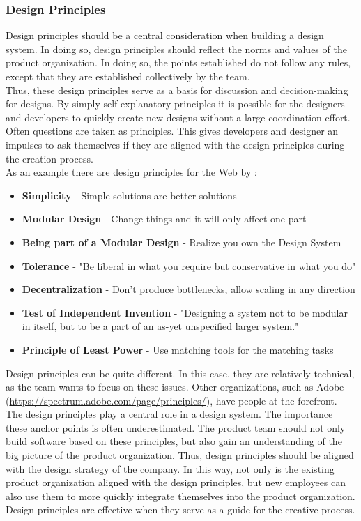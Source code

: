 \subsubsection{Design Principles}
Design principles should be a central consideration when building a design system. In doing so, design principles should reflect the norms and values of the product organization.  In doing so, the points established do not follow any rules, except that they are established collectively by the team.  \\
Thus, these design principles serve as a basis for discussion and decision-making for designs. By simply self-explanatory principles it is possible for the designers and developers to quickly create new designs without a large coordination effort. Often questions are taken as principles. This gives developers and designer an impulses to ask themselves if they are aligned with the design principles during the creation process. \cite{brignell_design_2022} \\
As an example there are design principles for the Web by \citet{berners-lee_principles_2013}: 
\begin{itemize}
\item \textbf{Simplicity} - Simple solutions are better solutions
\item \textbf{Modular Design} - Change things and it will only affect one part
\item \textbf{Being part of a Modular Design} - Realize you own the Design System
\item \textbf{Tolerance} - "Be liberal in what you require but conservative in what you do"
\item \textbf{Decentralization} - Don't produce bottlenecks, allow scaling in any direction
\item \textbf{Test of Independent Invention} - "Designing a system not to be modular in itself, but to be a part of an as-yet unspecified larger system."
\item \textbf{Principle of Least Power} - Use matching tools for the matching tasks
\end{itemize}
Design principles can be quite different. In this case, they are relatively technical, as the team wants to focus on these issues. Other organizations, such as Adobe (\url{https://spectrum.adobe.com/page/principles/}), have people at the forefront.  \\
The design principles play a central role in a design system. The importance these anchor points is often underestimated. The product team should not only build software based on these principles, but also gain an understanding of the big picture of the product organization. Thus, design principles should be aligned with the design strategy of the company.  In this way, not only is the existing product organization aligned with the design principles, but new employees can also use them to more quickly integrate themselves into the product organization.  Design principles are effective when they serve as a guide for the creative process.\cite{vesselov_building_2019} \\
